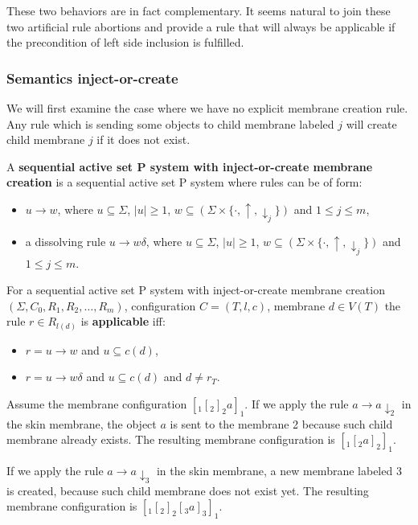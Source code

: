   These two behaviors are in fact complementary. It seems natural to join these two artificial rule abortions and provide a rule that will always be applicable if the precondition of left side inclusion is fulfilled.

  \subsubsection{Semantics inject-or-create} %
  \label{ssub:semantics_inject_or_create}
    
    We will first examine the case where we have no explicit membrane creation rule. Any rule which is sending some objects to child membrane labeled $j$ will create child membrane $j$ if it does not exist.

    \begin{definition}
      A {\bf sequential active set P system with inject-or-create membrane creation} is a sequential active set P system where rules can be of form:
      \begin{itemize}
        \item $u\rightarrow w$, where $u\subseteq \Sigma$, $|u|\geq 1$, $w\subseteq (\Sigma\times\{\cdot, \uparrow, \downarrow_j\})$ and $1\leq j\leq m$,
        \item a dissolving rule $u\rightarrow w\delta$, where $u\subseteq \Sigma$, $|u|\geq 1$, $w\subseteq (\Sigma\times\{\cdot, \uparrow, \downarrow_j\})$ and $1\leq j\leq m$.
      \end{itemize}
    \end{definition}

    \begin{definition}
      For a sequential active set P system with inject-or-create membrane creation $(\Sigma, C_0, R_1, R_2, \dots , R_m)$, configuration $C = (T, l, c)$, membrane $d\in V(T)$ the rule $r\in R_{l(d)}$ is {\bf applicable} iff:
      \begin{itemize}
        \item $r = u\rightarrow w$ and $u\subseteq c(d)$,
        \item $r = u\rightarrow w\delta$ and $u\subseteq c(d)$ and $d\neq r_T$.
      \end{itemize}
    \end{definition}

    \begin{example}
      Assume the membrane configuration $[_1 [_2 ]_2 a ]_1$. If we apply the rule $a \rightarrow a\downarrow_2$ in the skin membrane, the object $a$ is sent to the membrane 2 because such child membrane already exists. The resulting membrane configuration is $[_1 [_2 a ]_2 ]_1$.

      If we apply the rule $a \rightarrow a\downarrow_3$ in the skin membrane, a new membrane labeled 3 is created, because such child membrane does not exist yet. The resulting membrane configuration is $[_1 [_2 ]_2 [_3 a ]_3 ]_1$.
    \end{example}

